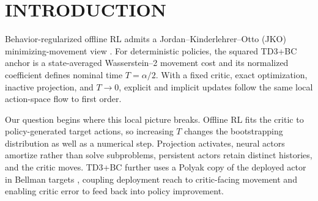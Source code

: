 \documentclass[twoside]{article}
\begin{document}

\begin{abstract}
The squared TD3+BC anchor admits a JKO-style Wasserstein--2 interpretation:
under a fixed critic and exact near-identity updates, splitting nominal time
$T$ across $K$ hops discretizes one local gradient flow. We study the
finite-$T$ regime where this picture fails. Proximal actor refinement through
target routing (PART) routes only the first of $K$ persistent actors into TD
targets and deploys the last. Across nine D4RL tasks, fourteen budgets, and
four seeds, the procedures are close at small $T$, but at $T=4,7$ TD3+BC falls
to $45.93,30.36$ while PART-P4 remains at $82.06,81.79$. Over $T\ge4$,
increasing $K$ from one to four raises the task-equal mean from $25.38$ to
$63.97$ and cuts score-$<20$ cells from $34/63$ to $8/63$; both disjoint seed
pairs reproduce the ordering. Matched audits show that P3/P4 reduce
first-branch action and target-value perturbation without typical final-policy
contraction. A two-actor P3 control reaches the same seed-mean collapse count
without sequential re-centering. In a completed 90-pair P4 comparison, PART
minus control has mean $-2.31$ and interval $[-7.25,2.41]$; the predeclared
outcome is unresolved. Thus PART shifts the finite-step stability boundary;
matched evidence is consistent with exposure--reach separation, while the
chain's incremental return benefit is not established.
\end{abstract}

\section{INTRODUCTION}
\label{sec:introduction}

Behavior-regularized offline RL admits a Jordan--Kinderlehrer--Otto (JKO) minimizing-movement view \citep{jordan1998variational}. For deterministic policies, the squared TD3+BC anchor is a state-averaged Wasserstein--2 movement cost and its normalized coefficient defines nominal time $T=\alpha/2$. With a fixed critic, exact optimization, inactive projection, and $T\to0$, explicit and implicit updates follow the same local action-space flow to first order.

Our question begins where this local picture breaks. Offline RL fits the critic to policy-generated target actions, so increasing $T$ changes the bootstrapping distribution as well as a numerical step. Projection activates, neural actors amortize rather than solve subproblems, persistent actors retain distinct histories, and the critic moves. TD3+BC further uses a Polyak copy of the deployed actor in Bellman targets \citep{fujimoto2021minimalist}, coupling deployment reach to critic-facing movement and enabling critic error to feed back into policy improvement.
\end{document}
